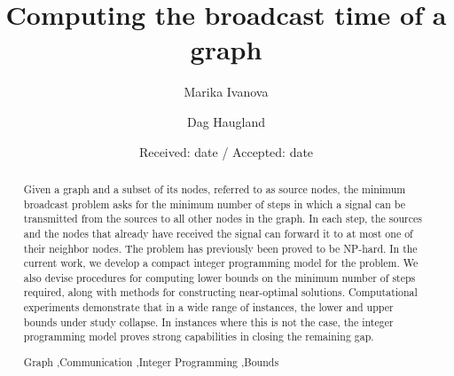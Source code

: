 \documentclass[preprint,12pt, review]{elsarticle}
\begin{document}
\begin{frontmatter}

\title{Computing the broadcast time of a graph}

\author{Marika Ivanova}

\author{Dag Haugland}

\address{Department of Informatics, University of Bergen, Norway}


\date{Received: date / Accepted: date}

\begin{abstract}
Given a graph and a subset of its nodes, referred to as source nodes, the minimum broadcast problem asks for the minimum number of steps in which a signal can be transmitted from the sources to all other nodes in the graph.
In each step, the sources and the nodes that already have received the signal can forward it to at most one of their neighbor nodes.
The problem has previously been proved to be NP-hard. 
In the current work, we develop a compact integer programming model for the problem.
We also devise procedures for computing lower bounds on the minimum number of steps required, along with methods for constructing near-optimal solutions.
Computational experiments demonstrate that in a wide range of instances, the lower and upper bounds under study collapse.
In instances where this is not the case, the integer programming model proves strong capabilities in closing the remaining gap.

\begin{keyword}
Graph \sep Communication \sep Integer Programming \sep Bounds
\end{keyword}
\end{abstract}
\end{frontmatter}








\end{document}
